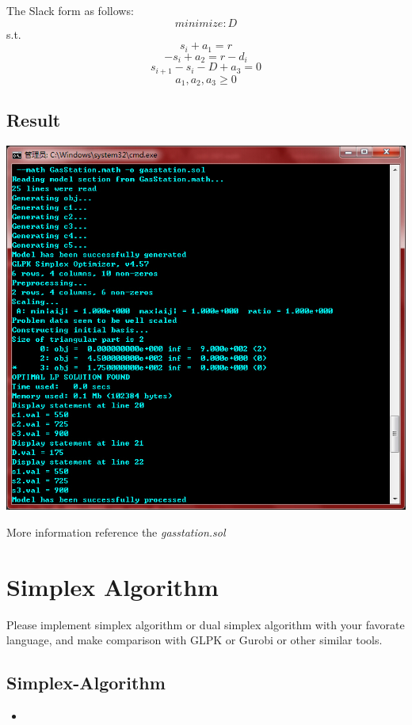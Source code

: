 \documentclass{article}
\newcommand{\pythonscript}[2]{
\begin{itemize}
\item[]
\end{itemize}
}
\numberwithin{equation}{section}
\begin{document}
The Slack form as follows:
        \begin{equation}
             minimize: D
        \end{equation}
        s.t.
        \begin{equation}
         s_i + a_1 =  r
        \end{equation}
        \begin{equation}
           - s_i + a_2 =  r - d_i
        \end{equation}
        \begin{equation}
         s_{i+1} - s_i - D + a_3 = 0 
        \end{equation}
        \begin{equation}
         a_1,a_2,a_3 \geq 0  
        \end{equation}
\subsection{Result}
        \begin{center}
            \includegraphics[width=0.75\columnwidth]{gasstationresult} %
        \end{center}
        More information reference the \emph{gasstation.sol}

%
%
\section{Simplex Algorithm}
Please implement simplex algorithm or dual simplex algorithm with your favorate language, and make comparison with GLPK or Gurobi or other similar tools.
\subsection{Simplex-Algorithm}
        \pythonscript{simplexity}{Simplex Algorithm using python implement}
\end{document}
